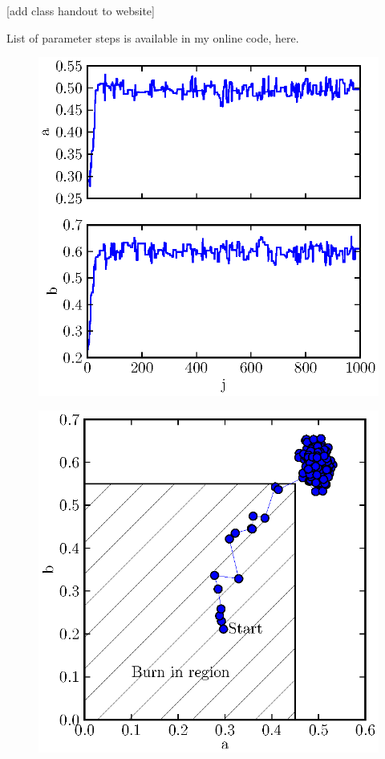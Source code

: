 \documentclass[iop,floatfix]{emulateapj}
\begin{document}
[add class handout to website]

List of parameter steps is available in my online code, here.




\begin{figure}
\begin{center}
  \includegraphics{param_vs_j}
  \caption{}
\label{fig:param_vs_j}
\end{center}
\end{figure}

\begin{figure}
\begin{center}
  \includegraphics{2d_burn_in}
  \caption{}
\label{fig:burn_in}
\end{center}
\end{figure}
\end{document}
